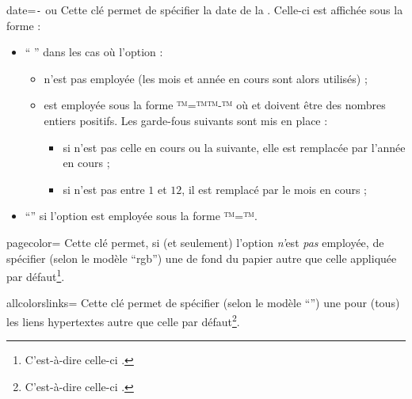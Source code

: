\documentclass{letgut}
\begin{document}
{%
  \begin{docKey}{date}{=\texttt{-} ou }{}
    Cette clé permet de spécifier la date de la . Celle-ci est affichée sous
    la forme :
    \begin{itemize}
    \item \enquote{ } dans les cas où l'option :
      \begin{itemize}
      \item n'est pas employée (les mois et année en cours sont alors
        utilisés) ;
      \item est employée sous la forme ™=™™-™
        où  et  doivent être des nombres entiers
        positifs. Les garde-fous suivants sont mis en place :
        \begin{itemize}
        \item si  n'est pas celle en cours ou la suivante, elle est
          remplacée par l'année en cours ;
        \item si  n'est pas entre $1$ et $12$, il est remplacé par le
          mois en cours ;
        \end{itemize}
      \end{itemize}
    \item \enquote{} si l'option est employée sous la forme
      ™=™.
    \end{itemize}
  \end{docKey}
}

\begin{docKey}{pagecolor}{=}{}
  Cette clé permet, si (et seulement) l'option  \emph{n'}est
  \emph{pas} employée, de spécifier (selon le modèle \enquote{rgb}) une
   de fond du papier autre que celle appliquée par
  défaut\footnote{C'est-à-dire \colorbox{letgutdefaultpagecolor}{celle-ci}%
    .}.
\end{docKey}

\begin{docKey}{allcolorslinks}{=}{}
  Cette clé permet de spécifier (selon le modèle \enquote{})
  une  pour (tous) les liens hypertextes autre que celle
   par défaut\footnote{C'est-à-dire
    \textcolor{letgut_allcolors_links}{celle-ci}%
    .}.
\end{docKey}
\end{document}
